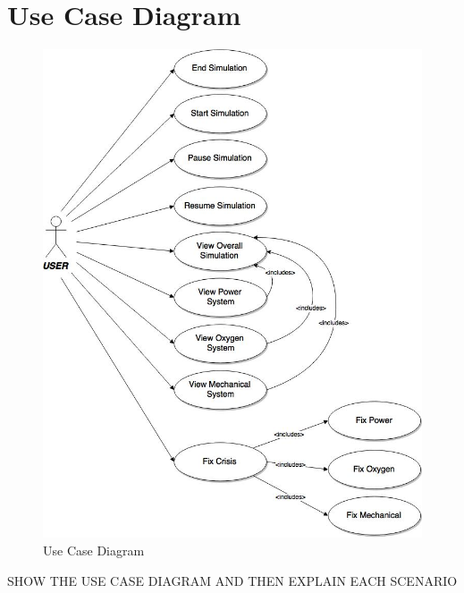 \documentclass[12pt, titlepage]{article}
\begin{document}
\section{Use Case Diagram}
\label{sec:use_case_diagram}
\begin{figure}[ht!]
\centering
\includegraphics[width=120mm]{UseCase.jpg}
\caption{Use Case Diagram \label{usecase}}
\end{figure}
SHOW THE USE CASE DIAGRAM AND THEN EXPLAIN EACH SCENARIO
\end{document}
